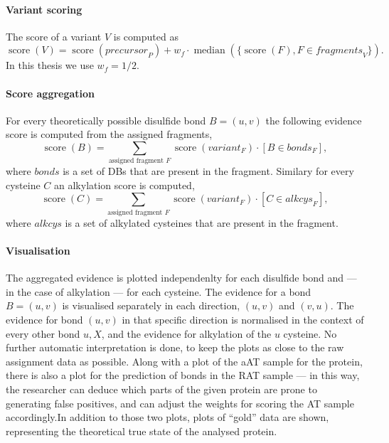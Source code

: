 \paragraph{Variant scoring} The score of a variant \(V\) is computed as \[\operatorname{score}(V) = \operatorname{score}(\mathit{precursor}_P) + w_f \cdot \operatorname{median}(\{ \operatorname{score}(F), F \in \mathit{fragments}_V \}).\] In this thesis we use \(w_f = 1/2\).

\paragraph{Score aggregation} For every theoretically possible disulfide bond \(B = (u, v)\) the following evidence score is computed  from the assigned fragments, \[\operatorname{score}(B) = \sum_{\text{assigned fragment } F} \operatorname{score}(\mathit{variant}_F) \cdot [B \in \mathit{bonds}_F], \] where \(\mathit{bonds}\) is a set of DBs that are present in the fragment. Similary for every cysteine \(C\) an alkylation score is computed, \[\operatorname{score}(C) = \sum_{\text{assigned fragment } F} \operatorname{score}(\mathit{variant}_F) \cdot [C \in \mathit{alkcys}_F],\] where \(\mathit{alkcys}\) is a set of alkylated cysteines that are present in the fragment.


\paragraph{Visualisation} The aggregated evidence is plotted independenlty for each disulfide bond and --- in the case of alkylation --- for each cysteine. The evidence for a bond \(B = (u, v)\) is visualised separately in each direction, \((u, v)\) and \((v, u)\). The evidence for bond \((u, v)\) in that specific direction is normalised in the context of every other bond \(u, X\), and the evidence for alkylation of the \(u\) cysteine. No further automatic interpretation is done, to keep the plots as close to the raw assignment data as possible. Along with a plot of the aAT sample for the protein, there is also a plot for the prediction of bonds in the RAT sample --- in this way, the researcher can deduce which parts of the given protein are prone to generating false positives, and can adjust the weights for scoring the AT sample accordingly.In addition to those two plots, plots of ``gold'' data are shown, representing the theoretical true state of the analysed protein.

